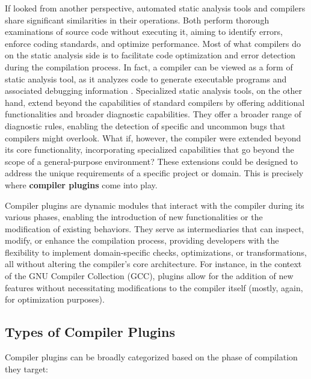 \documentclass[12pt,a4paper,openright,twoside]{book}
\begin{document}
If looked from another perspective, automated static analysis tools and
compilers share significant similarities in their operations. Both perform
thorough examinations of source code without executing it, aiming to identify
errors, enforce coding standards, and optimize performance. Most of what
compilers do on the static analysis side is to facilitate code optimization and
error detection during the compilation process. In fact, a compiler can be
viewed as a form of static analysis tool, as it analyzes code to generate
executable programs and associated debugging information
\cite{DBLP:journals/queue/Thomson21}.
%
Specialized static analysis tools, on the other hand, extend beyond the
capabilities of standard compilers by offering additional functionalities and
broader diagnostic capabilities. They offer a broader range of diagnostic rules,
enabling the detection of specific and uncommon bugs that compilers might
overlook.
%
What if, however, the compiler were extended beyond its core functionality,
incorporating specialized capabilities that go beyond the scope of a
general-purpose environment? These extensions could be designed to address the
unique requirements of a specific project or domain. This is precisely where
\textbf{compiler plugins} come into play.

Compiler plugins are dynamic modules that interact with the compiler during its
various phases, enabling the introduction of new functionalities or the
modification of existing behaviors. They serve as intermediaries that can
inspect, modify, or enhance the compilation process, providing developers with
the flexibility to implement domain-specific checks, optimizations, or
transformations, all without altering the compiler's core architecture. 
%
For instance, in the context of the GNU Compiler Collection
(GCC), plugins allow for the addition of new features without necessitating
modifications to the compiler itself (mostly, again, for optimization purposes).

\subsection{Types of Compiler Plugins}

Compiler plugins can be broadly categorized based on the phase of compilation they target:
\end{document}
